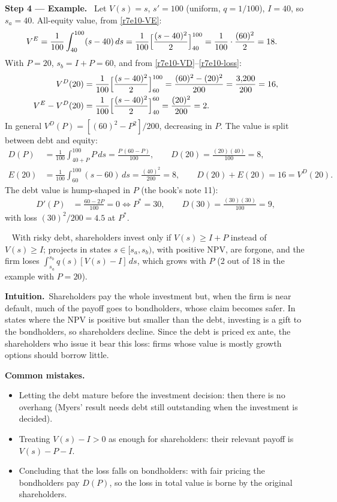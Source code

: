 \documentclass[11pt,a4paper]{article}
\newcommand{\step}[2]{\par\medskip\noindent\textbf{Step #1 --- #2.}~}
\newcommand{\intuition}{\par\medskip\noindent\textbf{Intuition.}~}
\newcommand{\answer}[1]{\par\smallskip\noindent\fbox{\textbf{Answer #1.}}~}
\newcommand{\pitfalls}{\par\medskip\noindent\textbf{Common mistakes.}}
\begin{document}
\step{4}{Example} Let $V(s)=s$, $s'=100$ (uniform, $q=1/100$), $I=40$, so $s_a=40$. All-equity value, from \eqref{r7e10-VE}:
\begin{align}
  V^{E} &= \frac{1}{100}\int_{40}^{100}(s-40)\,ds = \frac{1}{100}\Bigl[\frac{(s-40)^2}{2}\Bigr]_{40}^{100} = \frac{1}{100}\cdot\frac{(60)^2}{2} = 18. \nonumber
\end{align}
With $P=20$, $s_b=I+P=60$, and from \eqref{r7e10-VD}--\eqref{r7e10-loss}:
\begin{align}
  V^{D}(20) &= \frac{1}{100}\Bigl[\frac{(s-40)^2}{2}\Bigr]_{60}^{100} = \frac{(60)^2-(20)^2}{200} = \frac{3{,}200}{200} = 16, \nonumber\\
  V^{E}-V^{D}(20) &= \frac{1}{100}\Bigl[\frac{(s-40)^2}{2}\Bigr]_{40}^{60} = \frac{(20)^2}{200} = 2. \nonumber
\end{align}
In general $V^D(P)=[(60)^2-P^2]/200$, decreasing in $P$. The value is split between debt and equity:
\begin{align}
  D(P) &= \frac{1}{100}\int_{40+P}^{100} P\,ds = \frac{P\,(60-P)}{100}, \qquad D(20) = \frac{(20)(40)}{100} = 8, \nonumber\\
  E(20) &= \frac{1}{100}\int_{60}^{100}(s-60)\,ds = \frac{(40)^2}{200} = 8, \qquad D(20)+E(20) = 16 = V^{D}(20). \nonumber
\end{align}
The debt value is hump-shaped in $P$ (the book's note 11):
\begin{align}
  D'(P) &= \frac{60-2P}{100} = 0 \iff P^* = 30, \qquad D(30) = \frac{(30)(30)}{100} = 9, \nonumber
\end{align}
with loss $(30)^2/200=4.5$ at $P^*$.
\answer{\unskip} With risky debt, shareholders invest only if $V(s)\ge I+P$ instead of $V(s)\ge I$; projects in states $s\in[s_a,s_b)$, with positive NPV, are forgone, and the firm loses $\int_{s_a}^{s_b}q(s)[V(s)-I]\,ds$, which grows with $P$ (2 out of 18 in the example with $P=20$).

\intuition Shareholders pay the whole investment but, when the firm is near default, much of the payoff goes to bondholders, whose claim becomes safer. In states where the NPV is positive but smaller than the debt, investing is a gift to the bondholders, so shareholders decline. Since the debt is priced ex ante, the shareholders who issue it bear this loss: firms whose value is mostly growth options should borrow little.

\pitfalls
\begin{itemize}
  \item Letting the debt mature before the investment decision: then there is no overhang (Myers' result needs debt still outstanding when the investment is decided).
  \item Treating $V(s)-I>0$ as enough for shareholders: their relevant payoff is $V(s)-P-I$.
  \item Concluding that the loss falls on bondholders: with fair pricing the bondholders pay $D(P)$, so the loss in total value is borne by the original shareholders.
\end{itemize}
\end{document}
